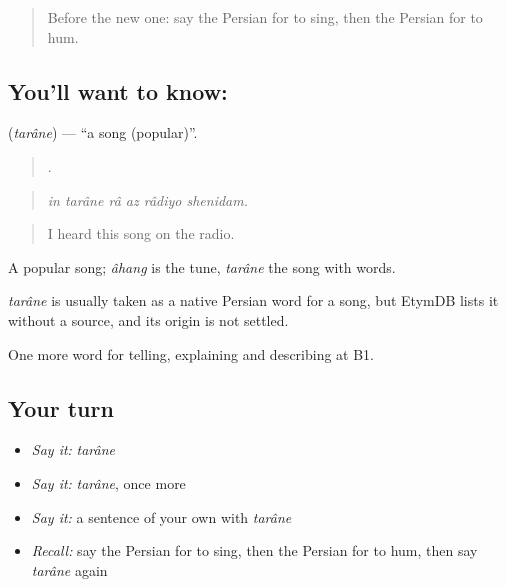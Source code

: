 \label{lesson:FA-C519-tarane}



\begin{quote}
Before the new one: say the Persian for to sing, then the Persian for to hum.
\end{quote}

\subsection*{You'll want to know: }
\textbf{} (\emph{tarâne}) — \textquotedblleft{}a song (popular)\textquotedblright{}.

\begin{quote}
     .
\end{quote}

\begin{quote}
\emph{in tarâne râ az râdiyo shenidam.}
\end{quote}

\begin{quote}
I heard this song on the radio.
\end{quote}

A popular song; \emph{âhang} is the tune, \emph{tarâne} the song with words.

\begin{cousinweb}
\emph{tarâne} is usually taken as a native Persian word for a song, but EtymDB lists it without a source, and its origin is not settled.
\end{cousinweb}

\begin{grammarlens}[title={What you've built}]
One more word for telling, explaining and describing at B1.
\end{grammarlens}

\subsection*{Your turn}
\begin{itemize}
\raggedright
  \item \emph{Say it:} \emph{tarâne}
  \item \emph{Say it:} \emph{tarâne}, once more
  \item \emph{Say it:} a sentence of your own with \emph{tarâne}
  \item \emph{Recall:} say the Persian for to sing, then the Persian for to hum, then say \emph{tarâne} again
\end{itemize}

